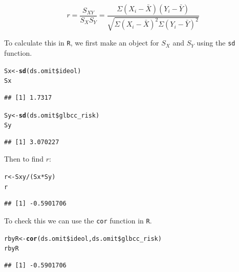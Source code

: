 \documentclass[11pt,openany]{book}\usepackage[]{graphicx}\usepackage[]{color}
\makeatletter
\newcommand{\hlopt}[1]{\textcolor[rgb]{0,0,0}{#1}}%
\newcommand{\hlstd}[1]{\textcolor[rgb]{0.345,0.345,0.345}{#1}}%
\newcommand{\hlkwb}[1]{\textcolor[rgb]{0.69,0.353,0.396}{#1}}%
\newcommand{\hlkwd}[1]{\textcolor[rgb]{0.737,0.353,0.396}{\textbf{#1}}}%
\newenvironment{kframe}{%
 \def\at@end@of@kframe{}%
 \ifinner\ifhmode%
  \def\at@end@of@kframe{\end{minipage}}%
  \begin{minipage}{\columnwidth}%
 \fi\fi%
 \def\FrameCommand##1{\hskip\@totalleftmargin \hskip-\fboxsep
 \colorbox{shadecolor}{##1}\hskip-\fboxsep
     \hskip-\linewidth \hskip-\@totalleftmargin \hskip\columnwidth}%
 \MakeFramed {\advance\hsize-\width
   \@totalleftmargin\z@ \linewidth\hsize
   \@setminipage}}%
 {\par\unskip\endMakeFramed%
 \at@end@of@kframe}
\newenvironment{knitrout}{}{} %
\renewenvironment{knitrout}{\begin{singlespace}}{\end{singlespace}}
\makeatother
\begin{document}
\begin{equation}
r=\frac{S_{XY}}{S_{X}S_{Y}}=\frac{\Sigma(X_{i}-\bar{X})(Y_{i}-\bar
  Y)}{\sqrt{\Sigma(X_{i}-\bar X)^{2} \Sigma(Y_{i}-\bar Y)^{2}}} 
\end{equation}

To calculate this in \texttt{R}, we first make an object for $S_{X}$ and $S_{Y}$ using the \texttt{sd} function. 
\begin{knitrout}
\color{fgcolor}\begin{kframe}
\begin{alltt}
\hlstd{Sx} \hlkwb{<-} \hlkwd{sd}\hlstd{(ds.omit}\hlopt{\$}\hlstd{ideol)}
\hlstd{Sx}
\end{alltt}
\begin{verbatim}
## [1] 1.7317
\end{verbatim}
\begin{alltt}
\hlstd{Sy} \hlkwb{<-} \hlkwd{sd}\hlstd{(ds.omit}\hlopt{\$}\hlstd{glbcc_risk)}
\hlstd{Sy}
\end{alltt}
\begin{verbatim}
## [1] 3.070227
\end{verbatim}
\end{kframe}
\end{knitrout}
\noindent Then to find $r$:
\begin{knitrout}
\color{fgcolor}\begin{kframe}
\begin{alltt}
\hlstd{r} \hlkwb{<-} \hlstd{Sxy}\hlopt{/}\hlstd{(Sx} \hlopt{*} \hlstd{Sy)}
\hlstd{r}
\end{alltt}
\begin{verbatim}
## [1] -0.5901706
\end{verbatim}
\end{kframe}
\end{knitrout}
\noindent To check this we can use the \texttt{cor} function in \texttt{R}. 
\begin{knitrout}
\color{fgcolor}\begin{kframe}
\begin{alltt}
\hlstd{rbyR} \hlkwb{<-} \hlkwd{cor}\hlstd{(ds.omit}\hlopt{\$}\hlstd{ideol, ds.omit}\hlopt{\$}\hlstd{glbcc_risk)}
\hlstd{rbyR}
\end{alltt}
\begin{verbatim}
## [1] -0.5901706
\end{verbatim}
\end{kframe}
\end{knitrout}
\end{document}
